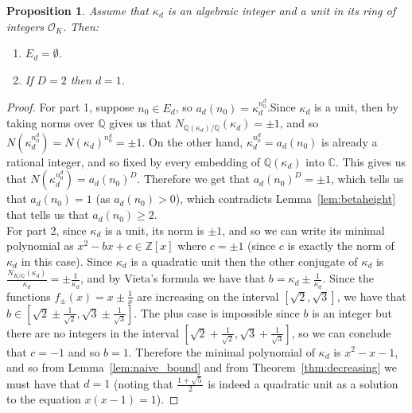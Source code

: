 \documentclass{article}
\theoremstyle{plain}
\newtheorem{proposition}[theorem]{Proposition}
\theoremstyle{definition}
\theoremstyle{remark}
\newcommand{\Z}{\mathbb{Z}}
\newcommand{\Q}{\mathbb{Q}}
\newcommand{\C}{\mathbb{C}}
\begin{document}
\begin{proposition}\label{cor:quadunit}
Assume that $\kappa_d$ is an algebraic integer and a unit in its ring of integers $\mathcal O_{K}$. Then:
\begin{enumerate}
    \item $E_d=\emptyset$.
    \item If $D=2$ then $d=1$.
\end{enumerate}

\end{proposition}
\begin{proof}
For part 1, suppose $n_0\in E_d$, so $a_d(n_0)=\kappa_d^{n_0^d}$.Since $\kappa_d$ is a unit, then by taking norms over $\Q$ gives us that $N_{\Q(\kappa_d)/\Q}(\kappa_d)=\pm1$, and so $N(\kappa_d^{n_0^d})=N(\kappa_d)^{n_0^d}=\pm1$. On the other hand,  $\kappa_d^{n_0^d}=a_d(n_0)$ is already a rational integer, and so fixed by every embedding of $\Q(\kappa_d)$ into $\C$. This gives us that $N(\kappa_d^{n_0^d})=a_d(n_0)^D$. Therefore we get that $a_d(n_0)^D=\pm1$, which tells us that $a_d(n_0)=1$ (as $a_d(n_0)>0$), which contradicts Lemma~\ref{lem:betaheight} that tells us that $a_d(n_0)\ge2$.\\

For part 2, since $\kappa_d$ is a unit, its norm is $\pm1$, and so we can write its minimal polynomial as $x^2-bx+c\in\Z[x]$ where $c=\pm1$ (since $c$ is exactly the norm of $\kappa_d$ in this case). Since $\kappa_d$ is a quadratic unit then the other conjugate of $\kappa_d$ is $\frac{N_{K/\Q}(\kappa_d)}{\kappa_d} = \pm \frac{1}{\kappa_d}$, and by Vieta's formula we have that $b=\kappa_d \pm \frac{1}{\kappa_d}$. Since the functions $f_{\pm}(x)=x\pm\frac{1}{x}$ are increasing on the interval $[\sqrt{2}, \sqrt{3}]$, we have that $b \in [\sqrt{2}\pm\frac{1}{\sqrt{2}}, \sqrt{3}\pm\frac{1}{\sqrt{3}}]$. The plus case is impossible since $b$ is an integer but there are no integers in the interval $[\sqrt{2}+\frac{1}{\sqrt{2}}, \sqrt{3}+\frac{1}{\sqrt{3}}]$, so we can conclude that $c=-1$ and so $b=1$. Therefore the minimal polynomial of $\kappa_d$ is $x^2-x-1$, and so from Lemma~\ref{lem:naive_bound} and from Theorem~\ref{thm:decreasing} we must have that $d=1$ (noting that $\tfrac{1+\sqrt5}2$ is indeed a quadratic unit as a solution to the equation $x(x-1)=1$).
\end{proof}
\end{document}
